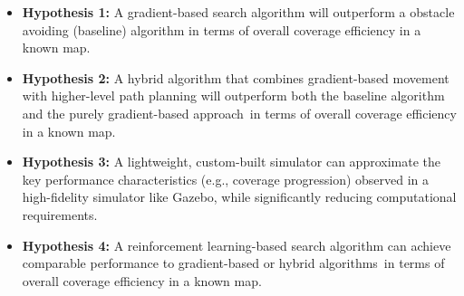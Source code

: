 \begin{itemize}
    \item \textbf{Hypothesis 1:} A gradient-based search algorithm will outperform a obstacle avoiding (baseline) algorithm in terms of overall coverage efficiency in a known map.
    \item \textbf{Hypothesis 2:} A hybrid algorithm that combines gradient-based movement with higher-level path planning will outperform both the baseline algorithm and the purely gradient-based approach in terms of overall coverage efficiency in a known map.
    \item \textbf{Hypothesis 3:} A lightweight, custom-built simulator can approximate the key performance characteristics (e.g., coverage progression) observed in a high-fidelity simulator like Gazebo, while significantly reducing computational requirements.
    \item {\color{red}\textbf{Hypothesis 4:} A reinforcement learning-based search algorithm can achieve comparable performance to gradient-based or hybrid algorithms in terms of overall coverage efficiency in a known map. }
\end{itemize}
